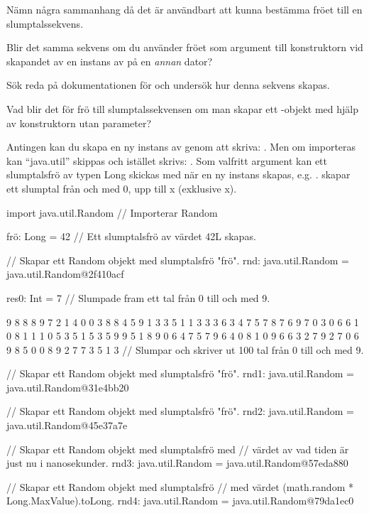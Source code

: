 {\Subtask\Pen Nämn några sammanhang då det är användbart att kunna bestämma fröet till en slumptalssekvens.

\Subtask Blir det samma sekvens om du använder fröet  som argument till konstruktorn vid skapandet av en instans av  på en \emph{annan} dator?

\Subtask Sök reda på dokumentationen för  och undersök hur denna sekvens skapas.

\Subtask Vad blir det för frö till slumptalssekvensen om man skapar ett -objekt med hjälp av konstruktorn utan parameter?

\SOLUTION


\TaskSolved \what


\SubtaskSolved  Antingen kan du skapa en ny instans av  genom att skriva: .
Men om  importeras kan “java.util” skippas och istället skrivs: .
Som valfritt argument kan ett slumptalsfrö av typen Long skickas med när en ny instans skapas, e.g. .
 skapar ett slumptal från och med 0, upp till x (exklusive x).

\SubtaskSolved  \begin{REPL}
import java.util.Random // Importerar Random

frö: Long = 42 // Ett slumptalsfrö av värdet 42L skapas.

  // Skapar ett Random objekt med slumptalsfrö "frö".
rnd: java.util.Random = java.util.Random@2f410acf

res0: Int = 7 // Slumpade fram ett tal från 0 till och med 9.

9 8 8 8 9 7 2 1 4 0 0 3 8 8 4 5 9 1 3 3 5 1 1
3 3 3 6 3 4 7 5 7 8 7 6 9 7 0 3 0 6 6 1 0 8 1
1 1 0 5 3 5 1 5 3 5 9 9 5 1 8 9 0 6 4 7 5 7 9
6 4 0 8 1 0 9 6 6 3 2 7 9 2 7 0 6 9 8 5 0 0 8
9 2 7 7 3 5 1 3 // Slumpar och skriver ut 100 tal från 0 till och med 9.

  // Skapar ett Random objekt med slumptalsfrö "frö".
rnd1: java.util.Random = java.util.Random@31e4bb20

  // Skapar ett Random objekt med slumptalsfrö "frö".
rnd2: java.util.Random = java.util.Random@45e37a7e

  // Skapar ett Random objekt med slumptalsfrö med
  // värdet av vad tiden är just nu i nanosekunder.
rnd3: java.util.Random = java.util.Random@57eda880

  // Skapar ett Random objekt med slumptalsfrö
  // med värdet (math.random * Long.MaxValue).toLong.
rnd4: java.util.Random = java.util.Random@79da1ec0


\end{REPL}}
